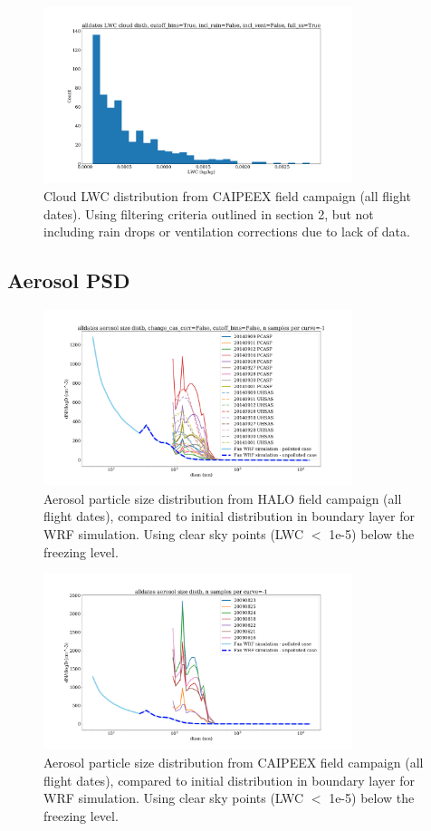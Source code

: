 \documentclass{article}
\begin{document}
\begin{figure}[ht]
    \centering
    \includegraphics[width=9cm]{revcaipeex/v10_lwc_hist_alldates_figure.png}
    \caption{Cloud LWC distribution from CAIPEEX field campaign (all flight dates). Using filtering criteria outlined in section 2, but not including rain drops or ventilation corrections due to lack of data.}
    \label{caipeexlwchist}
\end{figure}

\clearpage
\newpage

\subsection{Aerosol PSD}
\begin{figure}[ht]
    \centering
    \includegraphics[width=9cm]{revhalo/v1_aero_size_distb_alldates_figure.png}
    \caption{Aerosol particle size distribution from HALO field campaign (all flight dates), compared to initial distribution in boundary layer for WRF simulation. Using clear sky points (LWC $\lt$ 1e-5) below the freezing level.}
    \label{haloasdhist}
\end{figure}
\begin{figure}[ht]
    \centering
    \includegraphics[width=9cm]{revcaipeex/v1_aero_size_distb_alldates_figure.png}
    \caption{Aerosol particle size distribution from CAIPEEX field campaign (all flight dates), compared to initial distribution in boundary layer for WRF simulation. Using clear sky points (LWC $\lt$ 1e-5) below the freezing level.}
    \label{caipeexasdhist}
\end{figure}
\end{document}
